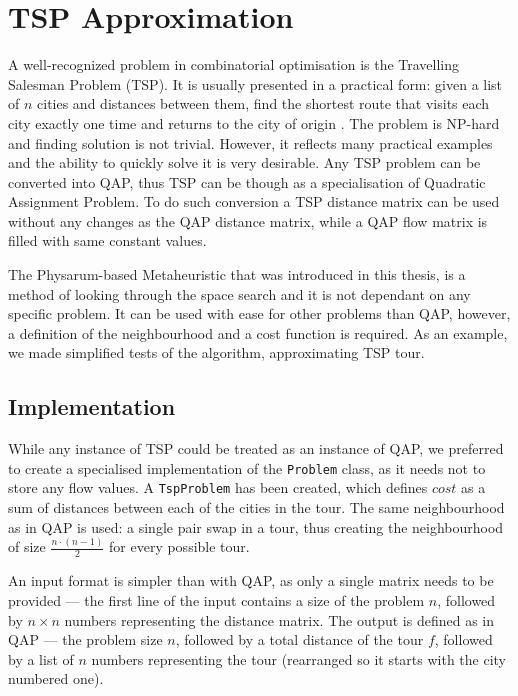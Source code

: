 \chapter{TSP Approximation}
\label{chapter:tsp}

A well-recognized problem in combinatorial optimisation is the Travelling Salesman Problem (TSP). It is usually presented in a practical form: given a list of $n$ cities and distances between them, find the shortest route that visits each city exactly one time and returns to the city of origin \cite{kruskal1956shortest}. The problem is NP-hard and finding solution is not trivial. However, it reflects many practical examples and the ability to quickly solve it is very desirable. Any TSP problem can be converted into QAP, thus TSP can be though as a specialisation of Quadratic Assignment Problem. To do such conversion a TSP distance matrix can be used without any changes as the QAP distance matrix, while a QAP flow matrix is filled with same constant values.

The Physarum-based Metaheuristic that was introduced in this thesis, is a method of looking through the space search and it is not dependant on any specific problem. It can be used with ease for other problems than QAP, however, a definition of the neighbourhood and a cost function is required. As an example, we made simplified tests of the algorithm, approximating TSP tour.


\section*{Implementation}

While any instance of TSP could be treated as an instance of QAP, we preferred to create a specialised implementation of the \texttt{Problem} class, as it needs not to store any flow values. A \texttt{TspProblem} has been created, which defines $cost$ as a sum of distances between each of the cities in the tour. The same neighbourhood as in QAP is used: a single pair swap in a tour, thus creating the neighbourhood of size $\frac{n\cdot(n-1)}{2}$ for every possible tour.

An input format is simpler than with QAP, as only a single matrix needs to be provided --- the first line of the input contains a size of the problem $n$, followed by $n{\times}n$ numbers representing the distance matrix. The output is defined as in QAP --- the problem size $n$, followed by a total distance of the tour $f$, followed by a list of $n$ numbers representing the tour (rearranged so it starts with the city numbered one).

